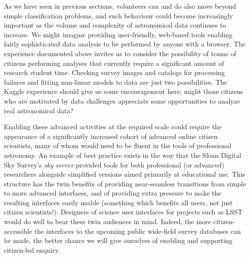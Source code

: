 \documentclass{ar2e}
\begin{document}



As we have seen in previous sections, volunteers can and do also move beyond
simple classification problems, and such behaviour could become increasingly
important as the volume and complexity of astronomical data continues to
increase.  We might imagine providing user-friendly, web-based tools enabling 
fairly sophisticated data analysis to be performed by anyone with a browser.
The experience documented above invites us to consider the possibility of
teams of citizens  performing analyses that currently require a significant
amount of research student time. Checking survey images and catalogs  for
processing failures and fitting non-linear models to data are just two
possibilities. The Kaggle experience should give us some encouragement here;
might those citizens who are motivated by data challenges appreciate some
opportunities to analyze real astronomical data?

Enabling these advanced activities at the required scale could require the
appearance of a significantly increased cohort of advanced online citizen
scientists, many of whom would need to be fluent in the tools of professional
astronomy. An example of best practice exists in the way that the Sloan Digital
Sky Survey's \emph{sky server} provided tools for both professional (or
advanced) researchers alongside simplified versions aimed primarily at
educational use. This structure has the twin benefits of providing near-seamless
transitions from simple to more advanced interfaces, and of providing extra
pressure to make the resulting interfaces easily usable  (something which
benefits all users, not just citizen scientists!). Designers of science user
interfaces for projects such as LSST would do well to bear these twin audiences
in mind. Indeed, the more citizen-accessible the interfaces to the upcoming
public wide-field survey databases can be made, the better chance we will give
ourselves of enabling and supporting citizen-led enquiry.  
\end{document}
